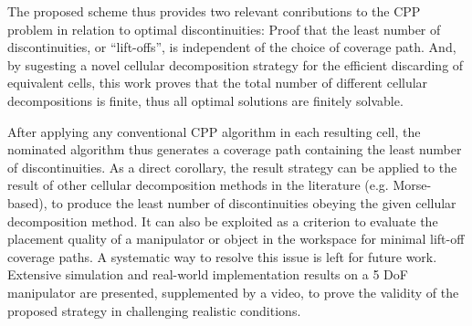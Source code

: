 \documentclass[journal]{IEEEtran}
\begin{document}
The proposed scheme thus provides two relevant conributions to the CPP problem in relation to optimal discontinuities:  
Proof that the least number of discontinuities, or ``lift-offs'', is independent of the choice of coverage path.  And,
by sugesting a novel cellular decomposition strategy for the efficient discarding of equivalent cells, this work proves 
that the total number of different cellular decompositions is finite, thus all optimal solutions are finitely solvable. 

After applying any conventional CPP algorithm in each resulting cell, the nominated algorithm thus generates a coverage path containing the least number of discontinuities. As a direct corollary, the result strategy can be applied to the result of other cellular decomposition methods in the literature (e.g. Morse-based), to produce the least number of discontinuities obeying the given cellular decomposition method. It can also be exploited as a criterion to evaluate the placement quality of a manipulator or object in the workspace for minimal lift-off coverage paths. A systematic way to resolve this issue is left for future work.
Extensive simulation and real-world implementation results on a 5 DoF manipulator are presented, supplemented by a video, to prove the validity of the proposed strategy in challenging realistic conditions.

%
%

\end{document}
